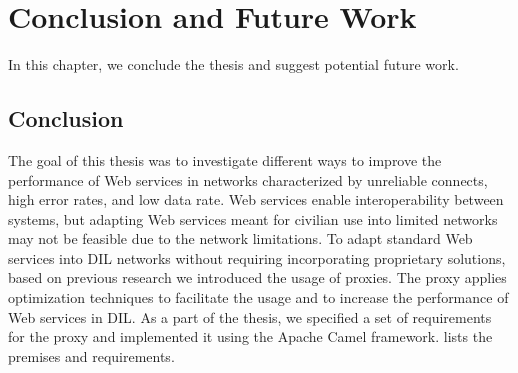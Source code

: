 \chapter{Conclusion and Future Work}
\label{chapter:conclusion}

In this chapter, we conclude the thesis and suggest potential future work.

\section{Conclusion}

The goal of this thesis was to investigate different ways to improve the
performance of Web services in networks characterized by unreliable connects,
high error rates, and low data rate. Web services enable interoperability between
systems, but adapting Web services meant for civilian use into limited networks
may not be feasible due to the network limitations. To adapt standard Web
services into DIL networks without requiring incorporating proprietary
solutions, based on previous research we introduced the usage of proxies. The
proxy applies optimization techniques to facilitate the usage and to increase
the performance of Web services in DIL. As a part of the thesis, we specified a
set of requirements for the proxy and implemented it using the Apache Camel
framework. lists the premises and
requirements.

